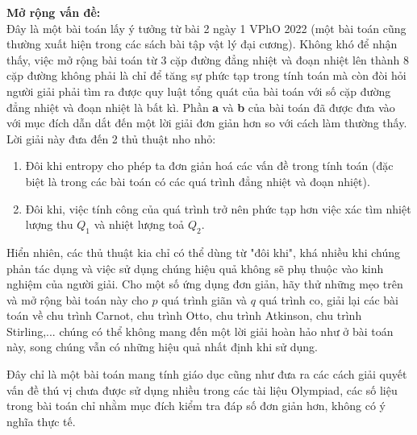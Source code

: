 \noindent \textbf{Mở rộng vấn đề:} \\
Đây là một bài toán lấy ý tưởng từ bài 2 ngày 1 VPhO 2022 (một bài toán cũng thường xuất hiện trong các sách bài tập vật lý đại cương). Không khó để nhận thấy, việc mở rộng bài toán từ 3 cặp đường đẳng nhiệt và đoạn nhiệt lên thành 8 cặp đường không phải là chỉ để tăng sự phức tạp trong tính toán mà còn đòi hỏi người giải phải tìm ra được quy luật tổng quát của bài toán với số cặp đường đẳng nhiệt và đoạn nhiệt là bất kì. Phần \textbf{a} và \textbf{b} của bài toán đã được đưa vào với mục đích dẫn dắt đến một lời giải đơn giản hơn so với cách làm thường thấy. \\
Lời giải này đưa đến 2 thủ thuật nho nhỏ:
\begin{enumerate}
    \item Đôi khi entropy cho phép ta đơn giản hoá các vấn đề trong tính toán (đặc biệt là trong các bài toán có các quá trình đẳng nhiệt và đoạn nhiệt).
    \item Đôi khi, việc tính công của quá trình trở nên phức tạp hơn việc xác tìm nhiệt lượng thu $Q_1$ và nhiệt lượng toả $Q_2$.
\end{enumerate}
Hiển nhiên, các thủ thuật kia chỉ có thể dùng từ "đôi khi", khá nhiều khi chúng phản tác dụng và việc sử dụng chúng hiệu quả không sẽ phụ thuộc vào kinh nghiệm của người giải. Cho một số ứng dụng đơn giản, hãy thử những mẹo trên và mở rộng bài toán này cho $p$ quá trình giãn và $q$ quá trình co, giải lại các bài toán về chu trình Carnot, chu trình Otto, chu trình Atkinson, chu trình Stirling,... chúng có thể không mang đến một lời giải hoàn hảo như ở bài toán này, song chúng vẫn có những hiệu quả nhất định khi sử dụng.

Đây chỉ là một bài toán mang tính giáo dục cũng như đưa ra các cách giải quyết vấn đề thú vị chưa được sử dụng nhiều trong các tài liệu Olympiad, các số liệu trong bài toán chỉ nhằm mục đích kiểm tra đáp số đơn giản hơn, không có ý nghĩa thực tế.
